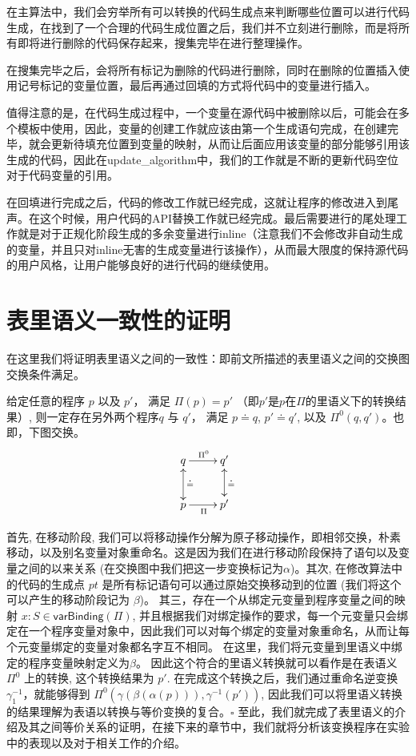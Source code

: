 在主算法中，我们会穷举所有可以转换的代码生成点来判断哪些位置可以进行代码生成，在找到了一个合理的代码生成位置之后，我们并不立刻进行删除，而是将所有即将进行删除的代码保存起来，搜集完毕在进行整理操作。

在搜集完毕之后，会将所有标记为删除的代码进行删除，同时在删除的位置插入使用记号标记的变量位置，最后再通过回填的方式将代码中的变量进行插入。

值得注意的是，在代码生成过程中，一个变量在源代码中被删除以后，可能会在多个模板中使用，因此，变量的创建工作就应该由第一个生成语句完成，在创建完毕，就会更新待填充位置到变量的映射，从而让后面应用该变量的部分能够引用该生成的代码，因此在\textsf{update\_algorithm}中，我们的工作就是不断的更新代码空位对于代码变量的引用。

在回填进行完成之后，代码的修改工作就已经完成，这就让程序的修改进入到尾声。在这个时候，用户代码的API替换工作就已经完成。最后需要进行的尾处理工作就是对于正规化阶段生成的多余变量进行inline（注意我们不会修改非自动生成的变量，并且只对inline无害的生成变量进行该操作），从而最大限度的保持源代码的用户风格，让用户能够良好的进行代码的继续使用。

\section{表里语义一致性的证明}
在这里我们将证明表里语义之间的一致性：即前文所描述的表里语义之间的交换图交换条件满足。

\begin{theorem}
给定任意的程序 $p$ 以及 $p'$， 满足 $\Pi(p)=p'$ （即$p'$是$p$在$\Pi$的里语义下的转换结果）, 则一定存在另外两个程序$q$ 与
$q'$， 满足 $p \doteq q$, $p' \doteq q'$, 以及 $\Pi^0(q, q')$。也即，下图交换。
\begin{equation*}
  \xymatrix{
    q \ar[r]^{\Pi^0}  & q' \ar@{<->}[d]^{
    \doteq} \\
     p \ar[r]_{\Pi} \ar@{<->}[u]_\doteq & p' }
\end{equation*}
\end{theorem}
 首先, 在移动阶段, 我们可以将移动操作分解为原子移动操作，即相邻交换，朴素移动，以及别名变量对象重命名。这是因为我们在进行移动阶段保持了语句以及变量之间的以来关系 (在交换图中我们把这一步变换标记为$\alpha$)。其次, 在修改算法中的代码的生成点 $pt$ 是所有标记语句可以通过原始交换移动到的位置 (我们将这个可以产生的移动阶段记为 $\beta$)。 其三，存在一个从绑定元变量到程序变量之间的映射 $x:S\in \mathsf{varBinding}(\Pi)$, 并且根据我们对绑定操作的要求，每一个元变量只会绑定在一个程序变量对象中，因此我们可以对每个绑定的变量对象重命名，从而让每个元变量绑定的变量对象都名字互不相同。 在这里，我们将元变量到里语义中绑定的程序变量映射定义为$\beta$。 因此这个符合的里语义转换就可以看作是在表语义 $\Pi^{0}$ 上的转换, 这个转换结果为 $p'$. 在完成这个转换之后，我们通过重命名逆变换 $\gamma_1^{-1}$，就能够得到 $\Pi^0(\gamma(\beta(\alpha(p))), \gamma^{-1}(p'))$, 因此我们可以将里语义转换的结果理解为表语以转换与等价变换的复合。$\square$
\medskip
至此，我们就完成了表里语义的介绍及其之间等价关系的证明，在接下来的章节中，我们就将分析该变换程序在实验中的表现以及对于相关工作的介绍。
